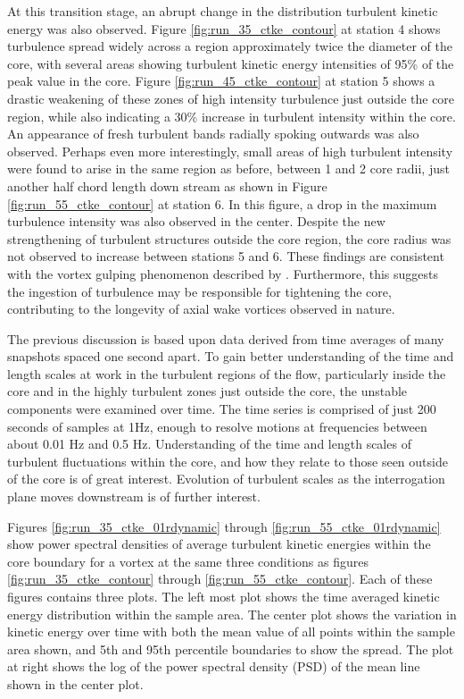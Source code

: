 


At this transition stage, an abrupt change in 
the distribution turbulent kinetic energy was also observed. Figure 
\ref{fig:run_35_ctke_contour} at station 4 shows turbulence spread widely 
across a region approximately twice the diameter of the core, with several 
areas showing turbulent kinetic energy intensities of 95\% of the peak value in 
the core. Figure \ref{fig:run_45_ctke_contour} at station 5 shows a drastic 
weakening of these zones of high intensity turbulence just outside the core 
region, while also indicating a 30\% increase in turbulent intensity within the 
core. An appearance of fresh turbulent bands radially spoking outwards was also 
observed. Perhaps even more interestingly, small areas of high turbulent 
intensity were found to arise in the same region as before, between 1 and 2 
core radii, just another half chord length down stream as shown in Figure 
\ref{fig:run_55_ctke_contour} at station 6. In this figure, a drop 
in the maximum turbulence intensity was also observed in the center. Despite 
the new strengthening of turbulent structures outside the core region, the core 
radius was not observed to increase between stations 5 and 6. These findings 
are consistent with the vortex gulping phenomenon described by 
\cite{bandyopadhyay1991}. Furthermore, this suggests the ingestion of 
turbulence may be responsible for tightening the core, contributing to the 
longevity of axial wake vortices observed in nature.





The previous discussion is based upon data derived from time averages of many 
snapshots spaced one second apart. To gain better understanding of the time and 
length scales at work in the turbulent regions of the flow, particularly inside 
the core and in the highly turbulent zones just outside the core, the unstable 
components were examined over time. The time series is comprised of just 200 
seconds of samples at 1Hz, enough to resolve motions at frequencies between 
about 0.01 Hz and 0.5 Hz. Understanding of the time and length scales of 
turbulent fluctuations within the core, and how they relate to those seen 
outside of the core is of great interest. Evolution of turbulent scales as the 
interrogation plane moves downstream is of further interest. 

Figures \ref{fig:run_35_ctke_01rdynamic} through 
\ref{fig:run_55_ctke_01rdynamic} show power spectral densities of 
average turbulent kinetic energies within the core boundary for a vortex at the 
same three conditions as figures \ref{fig:run_35_ctke_contour} through 
\ref{fig:run_55_ctke_contour}. Each of these figures contains three plots. The 
left most plot shows the time averaged kinetic energy distribution within the 
sample area. The center plot shows the variation in kinetic energy over time 
with both the mean value of all points within the sample area shown, 
and 5th and 95th percentile boundaries to show the spread. The plot at right 
shows the log of the power spectral density (PSD) of the mean line shown in the 
center plot. 

